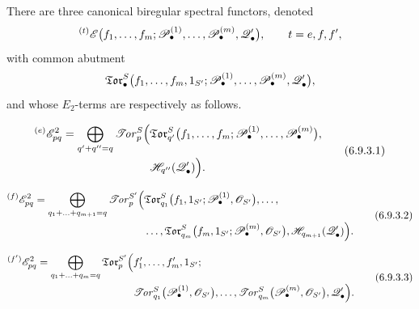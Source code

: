 \begin{proposition}[6.9.3]
\label{III.6.9.3}
There are three canonical biregular spectral functors, denoted
\[
  {}^{(t)}\mathscr{E}
  \bigl(
    f_1,\ldots,f_m;
    \mathscr{P}_\bullet^{(1)},\ldots,\mathscr{P}_\bullet^{(m)},
    \mathscr{Q}_\bullet'
  \bigr),
  \qquad
  t=e,f,f',
\]
with common abutment
\[
  \mathfrak{Tor}_\bullet^S
  \bigl(
    f_1,\ldots,f_m,1_{S'};
    \mathscr{P}_\bullet^{(1)},\ldots,\mathscr{P}_\bullet^{(m)},
    \mathscr{Q}_\bullet'
  \bigr),
\]
and whose $E_2$-terms are respectively as follows.


\begin{env}[6.9.3.1]
\label{III.6.9.3.1}
\[
\begin{split}
  {}^{(e)}\mathscr{E}_{pq}^2
  =
  \bigoplus_{q'+q''=q}
  \mathscr{T}\!\mathit{or}_p^S
  \Bigl(
    &
    \mathfrak{Tor}_{q'}^S
    \bigl(
      f_1,\ldots,f_m;
      \mathscr{P}_\bullet^{(1)},\ldots,\mathscr{P}_\bullet^{(m)}
    \bigr),
    \\
    &
    \mathscr{H}_{q''}(\mathscr{Q}_\bullet')
  \Bigr).
\end{split}
  \tag{6.9.3.1}\label{III.6.9.3.1.eq}
\]
\end{env}

\begin{env}[6.9.3.2]
\label{III.6.9.3.2}
\[
\begin{split}
  {}^{(f)}\mathscr{E}_{pq}^2
  =
  \bigoplus_{q_1+\ldots+q_{m+1}=q}
  \mathscr{T}\!\mathit{or}_p^{S'}
  \Bigl(
    &
    \mathfrak{Tor}_{q_1}^S
    \bigl(
      f_1,1_{S'};
      \mathscr{P}_\bullet^{(1)},\mathscr{O}_{S'}
    \bigr),
    \ldots,
    \\
    &
    \ldots,
    \mathfrak{Tor}_{q_m}^S
    \bigl(
      f_m,1_{S'};
      \mathscr{P}_\bullet^{(m)},\mathscr{O}_{S'}
    \bigr),
    \mathscr{H}_{q_{m+1}}(\mathscr{Q}_\bullet')
  \Bigr).
\end{split}
  \tag{6.9.3.2}\label{III.6.9.3.2.eq}
\]
\end{env}

\begin{env}[6.9.3.3]
\label{III.6.9.3.3}
\[
\begin{split}
  {}^{(f')}\mathscr{E}_{pq}^2
  =
  \bigoplus_{q_1+\ldots+q_m=q}
  \mathfrak{Tor}_p^{S'}
  \Bigl(
    &
    f_1',\ldots,f_m',1_{S'};
    \\
    &
    \mathscr{T}\!\mathit{or}_{q_1}^S
    \bigl(
      \mathscr{P}_\bullet^{(1)},\mathscr{O}_{S'}
    \bigr),
    \ldots,
    \mathscr{T}\!\mathit{or}_{q_m}^S
    \bigl(
      \mathscr{P}_\bullet^{(m)},\mathscr{O}_{S'}
    \bigr),
    \mathscr{Q}_\bullet'
  \Bigr).
\end{split}
  \tag{6.9.3.3}\label{III.6.9.3.3.eq}
\]
\end{env}
\end{proposition}

